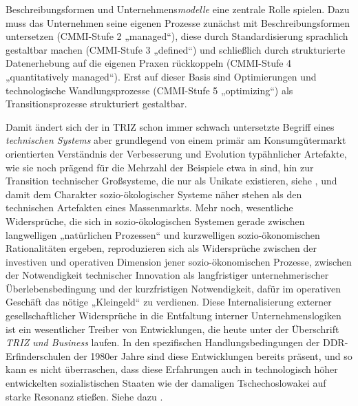 \documentclass[12pt,a4paper]{article}
\begin{document}
Beschreibungsformen und Unternehmens\emph{modelle} eine zentrale Rolle
spielen.  Dazu muss das Unternehmen seine eigenen Prozesse zunächst mit
Beschreibungsformen untersetzen (CMMI-Stufe 2 „managed“), diese durch
Standardisierung sprachlich gestaltbar machen (CMMI-Stufe 3 „defined“) und
schließlich durch strukturierte Datenerhebung auf die eigenen Praxen
rückkoppeln (CMMI-Stufe 4 „quantitatively managed“). Erst auf dieser Basis
sind Optimierungen und technologische Wandlungsprozesse (CMMI-Stufe 5
„optimizing“) als Transitionsprozesse strukturiert gestaltbar.

Damit ändert sich der in TRIZ schon immer schwach untersetzte Begriff eines
\emph{technischen Systems} aber grundlegend von einem primär am
Konsumgütermarkt orientierten Verständnis der Verbesserung und Evolution
typähnlicher Artefakte, wie sie noch prägend für die Mehrzahl der Beispiele
etwa in \cite{TESE2018} sind, hin zur Transition technischer Großsysteme, die
nur als Unikate existieren, siehe \cite{Graebe2020b}, und damit dem Charakter
sozio-ökologischer Systeme näher stehen als den technischen Artefakten eines
Massenmarkts.  Mehr noch, wesentliche Widersprüche, die sich in
sozio-ökologischen Systemen gerade zwischen langwelligen „natürlichen
Prozessen“ und kurzwelligen sozio-ökonomischen Rationalitäten ergeben,
reproduzieren sich als Widersprüche zwischen der investiven und operativen
Dimension jener sozio-ökonomischen Prozesse, zwischen der Notwendigkeit
technischer Innovation als langfristiger unternehmerischer Überlebensbedingung
und der kurzfristigen Notwendigkeit, dafür im operativen Geschäft das nötige
„Kleingeld“ zu verdienen.  Diese Internalisierung externer gesellschaftlicher
Widersprüche in die Entfaltung interner Unternehmenslogiken ist ein
wesentlicher Treiber von Entwicklungen, die heute unter der Überschrift
\emph{TRIZ und Business} laufen.  In den spezifischen Handlungsbedingungen der
DDR-Erfinderschulen der 1980er Jahre sind diese Entwicklungen bereits präsent,
und so kann es nicht überraschen, dass diese Erfahrungen auch in technologisch
höher entwickelten sozialistischen Staaten wie der damaligen Tschechoslowakei
auf starke Resonanz stießen.  Siehe dazu \cite{Graebe2019a}.
\end{document}

